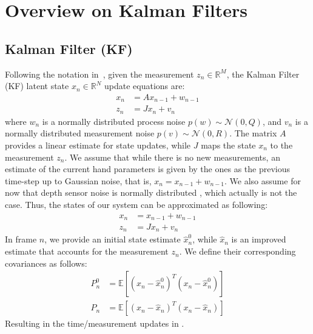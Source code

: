 \appendix

\section{Overview on Kalman Filters}

\subsection{Kalman Filter (KF)} 
\label{app:kalman}
Following the notation in~\cite{welch1995introduction}, given the measurement $z_n \in \mathbb{R}^M$, the Kalman Filter (KF) latent state $x_n \in \mathbb{R}^N$ update equations are:
% 
\begin{align}
x_n &= A x_{n - 1} +  w_{n - 1} \\
z_n &= J x_n + v_n
\end{align}
% 
where $w_n$ is a normally distributed process noise $p(w) \sim \mathcal{N}(0, Q)$, and $v_n$ is a normally distributed measurement noise $p(v) \sim \mathcal{N}(0, R)$. The matrix $A$ provides a linear estimate for state updates, while $J$ maps the state $x_n$ to the measurement $z_n$.
We assume that while there is no new measurements, an estimate of the current hand parameters is given by the ones as the previous time-step up to Gaussian noise, that is, $x_n = x_{n-1} + w_{n-1}$. We also assume for now that depth sensor noise is normally distributed , which actually is not the case. Thus, the states of our system can be approximated as following:
% 
\begin{align}
x_n &= x_{n - 1} + w_{n - 1} \\
z_n &= J x_n + v_n
\end{align}
% 
In frame $n$, we provide an initial state estimate $\hat{x}_n^0$, while $\hat{x}_n$ is an improved estimate that accounts for the measurement $z_n$. We define their corresponding covariances as follows: 
% 
\begin{align}
P_n^0 &= \mathbb{E}[(x_n - \hat{x}_n^0)^T(x_n - \hat{x}_n^0)]\\
P_n   &= \mathbb{E}[(x_n - \hat{x}_n)^T(x_n - \hat{x}_n)]
\end{align}
%
Resulting in the time/measurement updates in .

